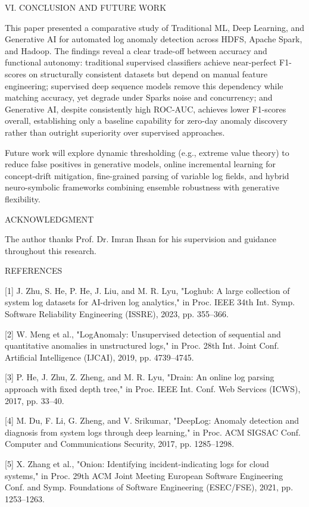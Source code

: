 \documentclass[
  11pt,
]{article}
\begin{document}
\textsc{VI. CONCLUSION AND FUTURE WORK}

This paper presented a comparative study of Traditional ML, Deep
Learning, and Generative AI for automated log anomaly detection across
HDFS, Apache Spark, and Hadoop. The findings reveal a clear trade-off
between accuracy and functional autonomy: traditional supervised
classifiers achieve near-perfect F1-scores on structurally consistent
datasets but depend on manual feature engineering; supervised deep
sequence models remove this dependency while matching accuracy, yet
degrade under Spark\textquotesingle s noise and concurrency; and
Generative AI, despite consistently high ROC-AUC, achieves lower
F1-scores overall, establishing only a baseline capability for zero-day
anomaly discovery rather than outright superiority over supervised
approaches.

Future work will explore dynamic thresholding (e.g., extreme value
theory) to reduce false positives in generative models, online
incremental learning for concept-drift mitigation, fine-grained parsing
of variable log fields, and hybrid neuro-symbolic frameworks combining
ensemble robustness with generative flexibility.

\textsc{ACKNOWLEDGMENT}

The author thanks Prof. Dr. Imran Ihsan for his supervision and guidance
throughout this research.

\textsc{REFERENCES}

{[}1{]} J. Zhu, S. He, P. He, J. Liu, and M. R. Lyu, "Loghub: A large
collection of system log datasets for AI-driven log analytics," in Proc.
IEEE 34th Int. Symp. Software Reliability Engineering (ISSRE), 2023, pp.
355--366.

{[}2{]} W. Meng et al., "LogAnomaly: Unsupervised detection of
sequential and quantitative anomalies in unstructured logs," in Proc.
28th Int. Joint Conf. Artificial Intelligence (IJCAI), 2019, pp.
4739--4745.

{[}3{]} P. He, J. Zhu, Z. Zheng, and M. R. Lyu, "Drain: An online log
parsing approach with fixed depth tree," in Proc. IEEE Int. Conf. Web
Services (ICWS), 2017, pp. 33--40.

{[}4{]} M. Du, F. Li, G. Zheng, and V. Srikumar, "DeepLog: Anomaly
detection and diagnosis from system logs through deep learning," in
Proc. ACM SIGSAC Conf. Computer and Communications Security, 2017, pp.
1285--1298.

{[}5{]} X. Zhang et al., "Onion: Identifying incident-indicating logs
for cloud systems," in Proc. 29th ACM Joint Meeting European Software
Engineering Conf. and Symp. Foundations of Software Engineering
(ESEC/FSE), 2021, pp. 1253--1263.
\end{document}
